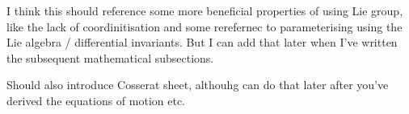 {\color{red} I think this should reference some more beneficial properties of using Lie group, like the lack of coordinitisation and some rerefernec to parameterising using the Lie algebra / differential invariants. But I can add that later when I've written the subsequent mathematical subsections. }


{\color{red} Should also introduce Cosserat sheet, althouhg can do that later after you've derived the equations of motion etc.}



